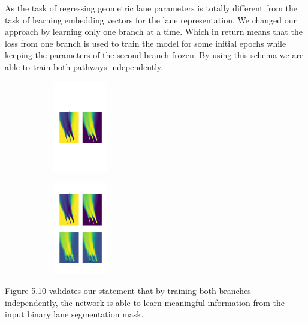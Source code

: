 As the task of regressing geometric lane parameters is totally different from the task of learning embedding vectors for the lane representation. We changed our approach by learning only one branch at a time. Which in return means that the loss from one branch is used to train the model for some initial epochs while keeping the parameters of the second branch frozen.  By using this schema we are able to train both pathways independently. 

 \begin{figure}[h]
      \caption{Activation maps of convolutional layers (a) embedding pathway (b) regression pathway, while training them independently}
        \centering
        \begin{subfigure}{0.6\textwidth}
        \includegraphics[width=1\linewidth, height=4cm]{images/activation_embedding.png} 
        \caption{}
        \label{fig:subim1}
        \end{subfigure}
        \begin{subfigure}{0.6\textwidth}
        \includegraphics[width=1\linewidth,height=4cm]{images/activation_regression.png}
        \caption{}
        \label{fig:subim2}
        \end{subfigure}
        \end{figure}

Figure 5.10 validates our statement that by training both branches independently, the network is able to learn meaningful information from the input binary lane segmentation mask.

